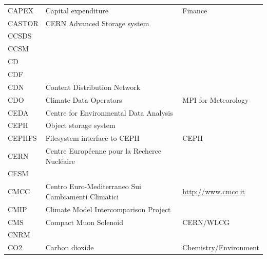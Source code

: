 \documentclass{../../template/esiwace-report}
\begin{document}
\begin{longtable}{|l|l|l|}
  CAPEX       &	Capital expenditure				&	Finance                         \\
  CASTOR      &	CERN Advanced Storage system                    &                                       \\
  CCSDS       &                                                       &                                       \\
  CCSM        &                                                       &                                       \\
  CD          &                                                       &                                       \\
  CDF         &                                                       &                                       \\
  CDN         &       Content Distribution Network                    &                                       \\
  CDO         &         Climate Data Operators                        &         MPI for Meteorology           \\
  CEDA        &	Centre for Environmental Data Analysis          &                                       \\
  CEPH        &	   Object storage system                              &                                       \\
  CEPHFS      &       Filesystem interface to CEPH                    &       CEPH                            \\
  CERN        &	Centre Europ\'eenne pour la Recherce Nucl\'eaire&                                       \\
  CESM        &                                                       &                                       \\
  CMCC        &         Centro Euro-Mediterraneo Sui Cambiamenti Climatici & \url{http://www.cmcc.it}                      \\
  CMIP        &         Climate Model Intercomparison Project         &                                       \\
  CMS         &	Compact Muon Solenoid	                        &                 CERN/WLCG             \\
  CNRM        &                                                       &                                       \\
  CO2         &         Carbon dioxide                                &         Chemistry/Environment         \\

\end{longtable}
\end{document}
